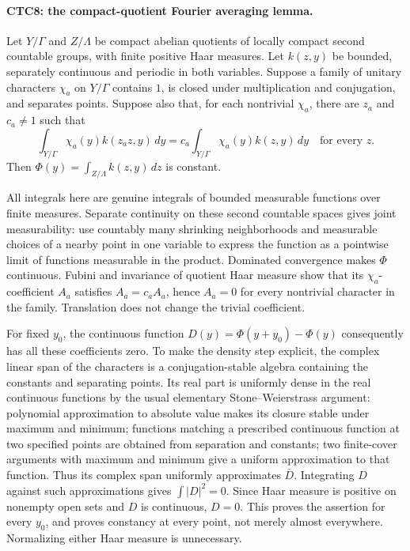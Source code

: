 \paragraph{CTC8: the compact-quotient Fourier averaging lemma.}
\label{claim:CTC8}
Let $Y/\Gamma$ and $Z/\Lambda$ be compact abelian quotients of
locally compact second countable groups, with finite positive Haar
measures.  Let $k(z,y)$ be bounded, separately continuous and
periodic in both variables.  Suppose a family of unitary characters
$\chi_a$ on $Y/\Gamma$ contains $1$, is closed under multiplication
and conjugation, and separates points.  Suppose also that, for each
nontrivial $\chi_a$, there are $z_a$ and $c_a\ne1$ such that
\[
 \int_{Y/\Gamma}\chi_a(y)k(z_a z,y)\,dy
       =c_a\int_{Y/\Gamma}\chi_a(y)k(z,y)\,dy
                      \quad\text{for every }z.
 \tag{CTC.24}
\]
Then $\Phi(y)=\int_{Z/\Lambda}k(z,y)\,dz$ is constant.

All integrals here are genuine integrals of bounded measurable
functions over finite measures.  Separate continuity on these
second countable spaces gives joint measurability: use countably
many shrinking neighborhoods and measurable choices of a nearby
point in one variable to express the function as a pointwise limit
of functions measurable in the product.  Dominated convergence
makes $\Phi$ continuous.  Fubini and invariance of quotient Haar
measure show that its $\chi_a$-coefficient $A_a$ satisfies
$A_a=c_aA_a$, hence $A_a=0$ for every nontrivial character in the
family.  Translation does not change the trivial coefficient.

For fixed $y_0$, the continuous function
$D(y)=\Phi(y+y_0)-\Phi(y)$ consequently has all these coefficients
zero.  To make the density step explicit, the complex linear span
of the characters is a conjugation-stable algebra containing the
constants and separating points.  Its real part is uniformly dense
in the real continuous functions by the usual elementary
Stone--Weierstrass argument: polynomial approximation to absolute
value makes its closure stable under maximum and minimum; functions
matching a prescribed continuous function at two specified points
are obtained from separation and constants; two finite-cover
arguments with maximum and minimum give a uniform approximation
to that function.  Thus its complex span uniformly approximates
$\bar D$.  Integrating $D$ against such approximations gives
$\int|D|^2=0$.  Since Haar measure is positive on nonempty open
sets and $D$ is continuous, $D=0$.  This proves the assertion for
every $y_0$, and proves constancy at every point, not merely almost
everywhere.  Normalizing either Haar measure is unnecessary.

